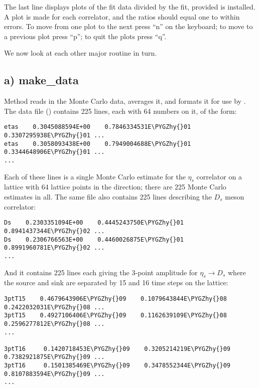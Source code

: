 \documentclass[letterpaper,10pt,english]{sphinxmanual}
\def\PYGZhy{\char`\-}
\begin{document}
The last line displays plots of the fit data divided by the fit, provided
 is installed. A plot is made for each correlator, and the
ratios should equal one to within errors. To
move from one plot to the next press ``n'' on the keyboard; to move to a
previous plot press ``p''; to quit the plots press ``q''.

We now look at each other major routine in turn.


\subsection{a) make\_data}
\label{corrfitter:id3}
Method  reads in the Monte Carlo data, averages
it, and formats it for use by {\hyperref[corrfitter:corrfitter.CorrFitter]{}}. The data file ()
contains 225 lines,  each with 64 numbers on it, of the form:

\begin{Verbatim}[commandchars=\\\{\}]
etas    0.3045088594E+00    0.7846334531E\PYGZhy{}01    0.3307295938E\PYGZhy{}01 ...
etas    0.3058093438E+00    0.7949004688E\PYGZhy{}01    0.3344648906E\PYGZhy{}01 ...
...
\end{Verbatim}

Each of these lines is a single Monte Carlo estimate for the \(\eta_s\)
correlator on a lattice with 64 lattice points in the  direction;
there are 225 Monte Carlo estimates in all. The same file also contains
225 lines describing the \(D_s\) meson correlator:

\begin{Verbatim}[commandchars=\\\{\}]
Ds    0.2303351094E+00    0.4445243750E\PYGZhy{}01    0.8941437344E\PYGZhy{}02 ...
Ds    0.2306766563E+00    0.4460026875E\PYGZhy{}01    0.8991960781E\PYGZhy{}02 ...
...
\end{Verbatim}

And it contains 225 lines each giving the 3-point amplitude for
\(\eta_s \to D_s\)
where the source and sink are separated by 15 and 16 time steps on the
lattice:

\begin{Verbatim}[commandchars=\\\{\}]
3ptT15    0.4679643906E\PYGZhy{}09    0.1079643844E\PYGZhy{}08    0.2422032031E\PYGZhy{}08 ...
3ptT15    0.4927106406E\PYGZhy{}09    0.1162639109E\PYGZhy{}08    0.2596277812E\PYGZhy{}08 ...
...

3ptT16     0.1420718453E\PYGZhy{}09    0.3205214219E\PYGZhy{}09    0.7382921875E\PYGZhy{}09 ...
3ptT16     0.1501385469E\PYGZhy{}09    0.3478552344E\PYGZhy{}09    0.8107883594E\PYGZhy{}09 ...
...
\end{Verbatim}
\end{document}
